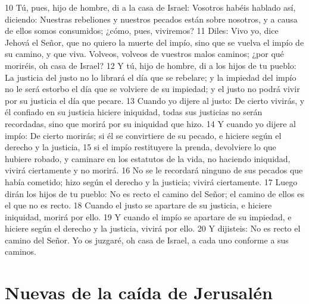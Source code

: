 10 Tú, pues, hijo de hombre, di a la casa de Israel: Vosotros habéis hablado así, diciendo: Nuestras rebeliones y nuestros pecados están sobre nosotros, y a causa de ellos somos consumidos; ¿cómo, pues, viviremos?
11 Diles: Vivo yo, dice Jehová el Señor, que no quiero la muerte del impío, sino que se vuelva el impío de su camino, y que viva. Volveos, volveos de vuestros malos caminos; ¿por qué moriréis, oh casa de Israel?
12 Y tú, hijo de hombre, di a los hijos de tu pueblo: La justicia del justo no lo librará el día que se rebelare; y la impiedad del impío no le será estorbo el día que se volviere de su impiedad; y el justo no podrá vivir por su justicia el día que pecare.
13 Cuando yo dijere al justo: De cierto vivirás, y él confiado en su justicia hiciere iniquidad, todas sus justicias no serán recordadas, sino que morirá por su iniquidad que hizo.
14 Y cuando yo dijere al impío: De cierto morirás; si él se convirtiere de su pecado, e hiciere según el derecho y la justicia,
15 si el impío restituyere la prenda, devolviere lo que hubiere robado, y caminare en los estatutos de la vida, no haciendo iniquidad, vivirá ciertamente y no morirá.
16 No se le recordará ninguno de sus pecados que había cometido; hizo según el derecho y la justicia; vivirá ciertamente.
17 Luego dirán los hijos de tu pueblo: No es recto el camino del Señor; el camino de ellos es el que no es recto.
18 Cuando el justo se apartare de su justicia, e hiciere iniquidad, morirá por ello.
19 Y cuando el impío se apartare de su impiedad, e hiciere según el derecho y la justicia, vivirá por ello.
20 Y dijisteis: No es recto el camino del Señor. Yo os juzgaré, oh casa de Israel, a cada uno conforme a sus caminos.

\section*{Nuevas de la caída de Jerusalén}


